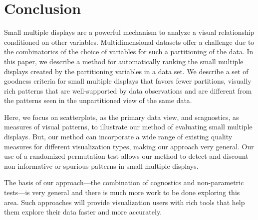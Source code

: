 \section{Conclusion}

Small multiple displays are a powerful mechanism to analyze a visual relationship conditioned on other variables. Multidimensional datasets offer a challenge due to the combinatorics of the choice of variables for such a partitioning of the data. In this paper, we describe a method for automatically ranking the small multiple displays created by the partitioning variables in a data set. We describe a set of goodness criteria for small multiple displays that favors fewer partitions, visually rich patterns that are well-supported by data observations and are different from the patterns seen in the unpartitioned view of the same data.

Here, we focus on scatterplots, as the primary data view, and scagnostics, as measures of visual patterns, to illustrate our method of evaluating small multiple displays. But, our method can incorporate a wide range of existing quality measures for different visualization types, making our approach very general. Our use of a randomized permutation test allows our method to detect and discount non-informative or spurious patterns in small multiple displays.

The basis of our approach---the combination of cognostics and non-parametric tests---is very general and there is much more work to be done exploring this area. Such approaches will provide visualization users with rich tools that help them explore their data faster and more accurately.
